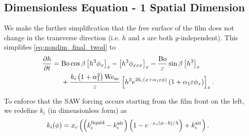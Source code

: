 \subsection{Dimensionless Equation - 1 Spatial Dimension}
\begin{frame}
    We make the further simplification that the free surface of the film does not change
    in the transverse direction (i.e.\! $h$ and $s$ are both $y$-independent). 
    This simplifies \cref{eq:nondim_final_twod} to 
    \begin{equation}
        \begin{aligned}
            \frac{\partial h}{\partial t} = \; &\mathrm{Bo}\cos\beta \left[ h^3 \phi_x \right]_x - \left[ h^3 \phi_{xxx} \right]_{x} - \frac{\mathrm{Bo}}{\varepsilon} \sin\beta \left[ h^3 \right]_{x} \\  
            &+\frac{k_i \left( 1 + \alpha_1^2 \right)\mathrm{We_{ac}}}{\varepsilon} \left[ h^3 e^{2k_i \left( x + \alpha_1 \varepsilon \phi \right)} \left( 1 + \alpha_1 \varepsilon \phi_x \right) \right]_x.
        \end{aligned} 
        \label{eq:nondim_final_oned}
    \end{equation}
 
    To enforce that the SAW forcing occurs starting from the film front on the left, we redefine 
    $k_i$ (in dimensionless form) as 
    \begin{equation*}
        k_i\!\left( \phi \right) = x_c \left( \left( k_i^{\text{liquid}} - k_i^{\text{air}} \right)\left( 1 - e^{-x_c(\phi-b)/\lambda} \right) + k_i^{\text{air}} \right).
        \label{eq:k_i}
    \end{equation*}
\end{frame}
